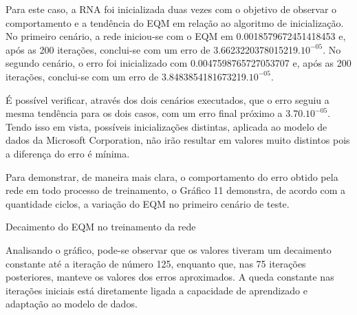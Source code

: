 Para este caso, a RNA foi inicializada duas vezes com o objetivo de observar o comportamento e a tendência do EQM em relação ao algoritmo de inicialização. No primeiro cenário, a rede iniciou-se com o EQM em 0.0018579672451418453 e, após as 200 iterações, conclui-se com um erro de 3.6623220378015219.$10^{-05}$. No segundo cenário, o erro foi inicializado com 0.0047598765727053707 e, após as 200 iterações, conclui-se com um erro de 3.8483854181673219.$10^{-05}$.

É possível verificar, através dos dois cenários executados, que o erro seguiu a mesma tendência para os dois casos, com um erro final próximo a 3.70.$10^{-05}$. Tendo isso em vista, possíveis inicializações distintas, aplicada ao modelo de dados da Microsoft Corporation, não irão resultar em valores muito distintos pois a diferença do erro é mínima.

Para demonstrar, de maneira mais clara, o comportamento do erro obtido pela rede em todo processo de treinamento, o Gráfico 11 demonstra, de acordo com a quantidade ciclos, a variação do EQM no primeiro cenário de teste.
\begin{grafico}[h]
	\centering
	\caption{Decaimento do EQM no treinamento da rede}
	\label{lingua}
\end{grafico}

Analisando o gráfico, pode-se observar que os valores tiveram um decaimento constante até a iteração de número 125, enquanto que, nas 75 iterações posteriores, manteve os valores dos erros aproximados. A queda constante nas iterações iniciais está diretamente ligada a capacidade de aprendizado e adaptação ao modelo de dados.

